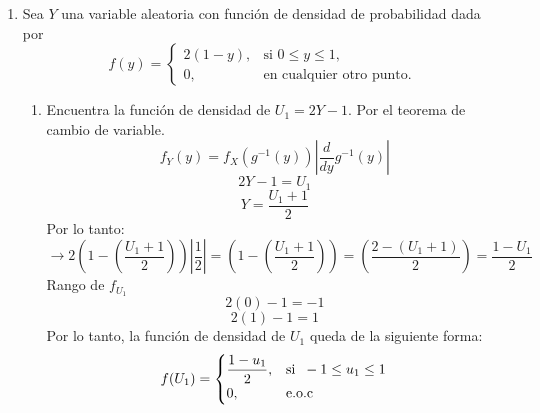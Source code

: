 \documentclass[11pt,a4paper]{report}
\begin{document}
\begin{enumerate}
    \item Sea \( Y \) una variable aleatoria con función de densidad de probabilidad dada por
\[
f(y) =
\begin{cases}
    2(1 - y), & \text{si } 0 \leq y \leq 1, \\
    0, & \text{en cualquier otro punto}.
\end{cases}
\]

\begin{enumerate}
    \item Encuentra la función de densidad de \( U_1 = 2Y - 1 \). \newline
    Por el teorema de cambio de variable.
    \[f_Y(y) = f_X(g^{-1}(y)) \left| \frac{d}{dy} g^{-1}(y) \right|\]
    \[2Y-1 = U_{1}\]
    \[Y = \dfrac{U_{1}+1}{2}\]
    Por lo tanto: 
    \[ \rightarrow 2\left(1-\left( \dfrac{U_{1}+1}{2}\right) \right)\left| \dfrac{1}{2}\right| =  \left(1-\left(\dfrac{U_{1}+1}{2}\right)\right) = \left(\dfrac{2-(U_1+1)}{2}\right) = \dfrac{1-U_{1}}{2}\]
    Rango de $f_{U_{1}}$ 
    \[2(0)-1 = -1\]
    \[2(1)-1 = 1\]
    Por lo tanto, la función de densidad de $U_{1}$ queda de la siguiente forma:  \newline
    \[ f(U_{1}) = 
    \begin{cases}
        \dfrac{1-u_{1}}{2}, & \text{si}\hspace{0.2cm} -1 \leq u_{1} \leq 1 \\
        0, & \text{e.o.c}
    \end{cases}
    \]


\end{enumerate}
\end{enumerate}
\end{document}
